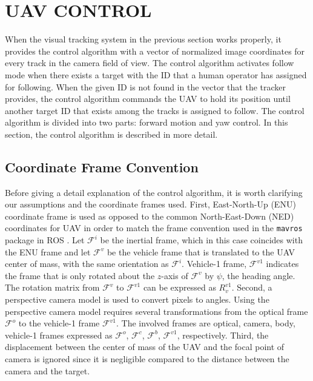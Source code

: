 \documentclass[letterpaper, 10 pt, conference]{ieeeconf}  %
\begin{document}
\section{UAV CONTROL}


When the visual tracking system in the previous section works properly, it provides the control algorithm with a vector of normalized image coordinates for every track in the camera field of view. The control algorithm activates follow mode when there exists a target with the ID that a human operator has assigned for following. When the given ID is not found in the vector that the tracker provides, the control algorithm commands the UAV to hold its position until another target ID that exists among the tracks is assigned to follow. The control algorithm is divided into two parts: forward motion and yaw control. In this section, the control algorithm is described in more detail.

\subsection{Coordinate Frame Convention}
Before giving a detail explanation of the control algorithm, it is worth clarifying our assumptions and the coordinate frames used. First, East-North-Up (ENU) coordinate frame is used as opposed to the common North-East-Down (NED) coordinates for UAV \cite{UAVbook} in order to match the frame convention used in the \texttt{mavros} package in ROS \cite{mavros}. Let $\mathcal{F}^i$ be the inertial frame, which in this case coincides with the ENU frame and let $\mathcal{F}^v$ be the vehicle frame that is translated to the UAV center of mass, with the same orientation as $\mathcal{F}^i$. Vehicle-1 frame, $\mathcal{F}^{v1}$ indicates the frame that is only rotated about the $z$-axis of $\mathcal{F}^{v}$ by $\psi$, the heading angle. The rotation matrix from $\mathcal{F}^v$ to $\mathcal{F}^{v1}$ can be expressed as $R^{v1}_v$. Second, a perspective camera model is used to convert pixels to angles. Using the perspective camera model requires several transformations from the optical frame $\mathcal{F}^o$ to the vehicle-1 frame $\mathcal{F}^{v1}$. The involved frames are optical, camera, body, vehicle-1 frames expressed as $\mathcal{F}^o$, $\mathcal{F}^c$, $\mathcal{F}^b$, $\mathcal{F}^{v1}$, respectively. Third, the displacement between the center of mass of the UAV and the focal point of camera is ignored since it is negligible compared to the distance between the camera and the target. 
\end{document}
